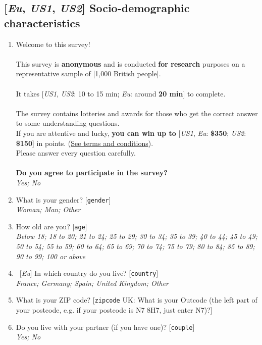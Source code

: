 \subsection*{[\textit{Eu}, \textit{US1}, \textit{US2}] Socio-demographic characteristics}
\begin{enumerate}
\item Welcome to this survey!\\
\\
This survey is \textbf{anonymous} and is conducted \textbf{for research} purposes on a representative sample of [1,000 British people].\\
 \\
It takes [\textit{US1}, \textit{US2}: 10 to 15 min; \textit{Eu}: around \textbf{20 min}] to complete.  \\
 \\
The survey contains lotteries and awards for those who get the correct answer to some understanding questions.\\
If you are attentive and lucky, \textbf{you can win up to }[\textit{US1}, \textit{Eu}: \textbf{\$350}; \textit{US2}: \textbf{\$150}] in points. (\href{https://uvafeb.eu.qualtrics.com/WRQualtricsControlPanel/File.php?F=F_cBZAXTgNktGZbee&download=1}{See terms and conditions}).    \\
Please answer every question carefully.  \\
 \\
\textbf{Do you agree to participate in the survey?}
\\ \textit{Yes; No}
\item What is your gender? [\verb|gender|]
\\ \textit{Woman; Man; Other}
\item How old are you? [\verb|age|]
\\ \textit{Below 18; 18 to 20; 21 to 24; 25 to 29; 30 to 34; 35 to 39; 40 to 44; 45 to 49; 50 to 54; 55 to 59; 60 to 64; 65 to 69; 70 to 74; 75 to 79; 80 to 84; 85 to 89; 90 to 99; 100 or above}
\item ~[\textit{Eu}] In which country do you live? [\verb|country|]
\\ \textit{France; Germany; Spain; United Kingdom; Other}
\item What is your ZIP code? [\verb|zipcode| UK: What is your Outcode (the left part of your postcode, e.g. if your postcode is N7 8H7, just enter N7)?]
\item  \label{q:partner} Do you live with your partner (if you have one)? [\verb|couple|]
\\ \textit{Yes; No}

\end{enumerate}
